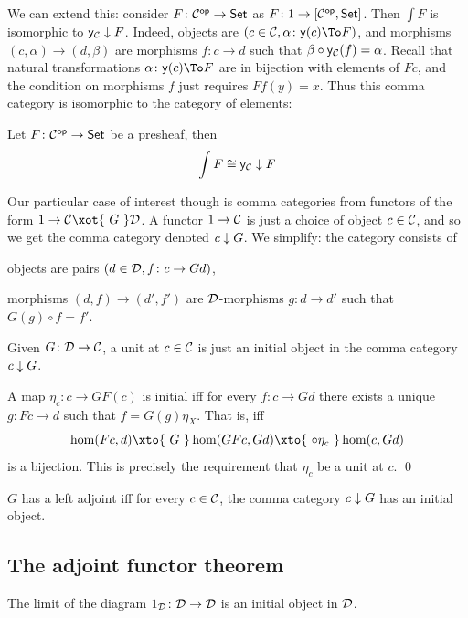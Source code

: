 We can extend this: consider $F\colon{{\cal C}}^{\sf op}\to{\sf Set}$ as $F\colon1\to[{{\cal C}}^{\sf op},{\sf Set}]$.
Then $\int F$ is isomorphic to ${\sf y}_{{\cal C}}\downarrow F$.
Indeed, objects are $(c\in\C,\alpha\colon\y(c)\To F)$, and morphisms $(c,\alpha)\to(d,\beta)$ are morphisms $f\colon c\to d$ such that $\beta\circ{\sf y}_{{\cal C}}(f)=\alpha$.
Recall that natural transformations $\alpha\colon\y(c)\To F$ are in bijection with elements of $Fc$, and the condition on morphisms $f$ just requires $Ff(y)=x$.
Thus this comma category is isomorphic to the category of elements:

\bprop

    Let $F\colon{{\cal C}}^{\sf op}\to{\sf Set}$ be a presheaf, then
    $$ \int F \cong {\sf y}_{{\cal C}}\downarrow F $$

\eprop

Our particular case of interest though is comma categories from functors of the form $1\to\C\xot{\ G\ }\D$.
A functor $1\to{{\cal C}}$ is just a choice of object $c\in{{\cal C}}$, and so we get the comma category denoted $c\downarrow G$.
We simplify: the category consists of
\benum
    \item objects are pairs $(d\in{{\cal D}},f\colon c\to Gd)$,
    \item morphisms $(d,f)\to(d',f')$ are ${{\cal D}}$-morphisms $g\colon d\to d'$ such that $G(g)\circ f=f'$.
\eenum

\blemm

    Given $G\colon{{\cal D}}\to{{\cal C}}$, a unit at $c\in{{\cal C}}$ is just an initial object in the comma category $c\downarrow G$.

\elemm

\bproof

    A map $\eta_c\colon c\to GF(c)$ is initial iff for every $f\colon c\to Gd$ there exists a unique $g\colon Fc\to d$ such that $f=G(g)\eta_X$.
    That is, iff
    $$ \hom(Fc,d) \xto{\ G\ } \hom(GFc,Gd) \xto{\ \circ\eta_c\ } \hom(c,Gd) $$
    is a bijection.
    This is precisely the requirement that $\eta_c$ be a unit at $c$.
    \qed

\eproof

\bcoro

    $G$ has a left adjoint iff for every $c\in{{\cal C}}$, the comma category $c\downarrow G$ has an initial object.

\ecoro

\subsection{The adjoint functor theorem}

\blemm

    The limit of the diagram $1_{{\cal D}}\colon{{\cal D}}\to{{\cal D}}$ is an initial object in ${{\cal D}}$.

